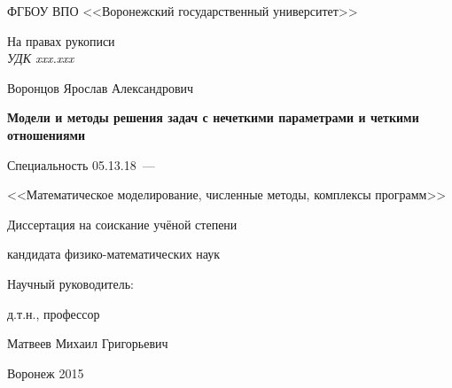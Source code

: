 \thispagestyle{empty}

\begin{center}
ФГБОУ ВПО <<Воронежский государственный университет>>\par
\par 
\par
\end{center}

\vspace{10mm}
\begin{flushright}
На правах рукописи \\
{\sl УДК xxx.xxx\/}
\end{flushright}

\vspace{15mm}
\begin{center}
{\large Воронцов Ярослав Александрович}
\end{center}

\vspace{5mm}
\begin{center}
{\bf \large Модели и методы решения задач с нечеткими параметрами и четкими отношениями
\par}

\vspace{10mm}
{%
Специальность 05.13.18~---

<<Математическое моделирование, численные методы, комплексы программ>>
}

\vspace{10mm}
Диссертация на соискание учёной степени

кандидата физико-математических наук
\end{center}

\vspace{20mm}
\begin{flushright}
Научный руководитель:

д.т.н., профессор

Матвеев Михаил Григорьевич

\end{flushright}

\vspace{20mm}
\begin{center}
{Воронеж 2015}
\end{center}

\newpage